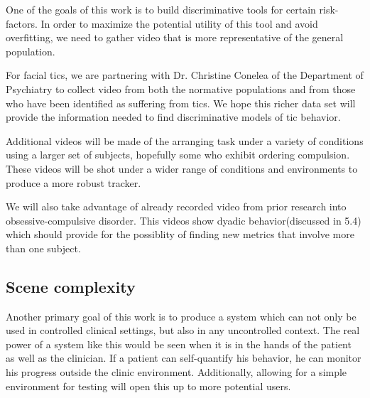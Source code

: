 \documentclass[11pt]{article}
\begin{document}
One of the goals of this work is to build discriminative tools for certain risk-factors. In order to maximize the potential utility of this tool and avoid overfitting, we need to gather video that is more representative of the general population.

For facial tics, we are partnering with Dr. Christine Conelea of the Department of Psychiatry to collect video from both the normative populations and from those who have been identified as suffering from tics. We hope this richer data set will provide the information needed to find discriminative models of tic behavior.

Additional videos will be made of the arranging task under a variety of conditions using a larger set of subjects, hopefully some who exhibit ordering compulsion. These videos will be shot under a wider range of conditions and environments to produce a more robust tracker.

We will also take advantage of already recorded video from prior research into obsessive-compulsive disorder. This videos show dyadic behavior(discussed in 5.4) which should provide for the possiblity of finding new metrics that involve more than one subject.
\subsection{Scene complexity}
Another primary goal of this work is to produce a system which can not only be used in controlled clinical settings, but also in any uncontrolled context. The real power of a system like this would be seen when it is in the hands of the patient as well as the clinician. If a patient can self-quantify his behavior, he can monitor his progress outside the clinic environment. Additionally, allowing for a simple environment for testing will open this up to more potential users.
\end{document}
